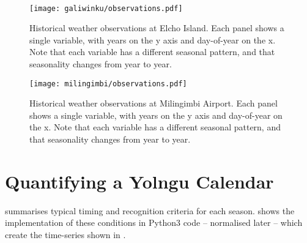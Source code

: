 ~\\



\begin{figure}[p]
    \centering
    \texttt{[image: galiwinku/observations.pdf]}
    \caption[Historical weather observations at Elcho Island]{
        Historical weather observations at Elcho Island.
        Each panel shows a single variable, with years on the y axis and day-of-year on the x.
        Note that each variable has a different seasonal pattern,
        and that seasonality changes from year to year.}
    \label{fig:galiwinku-observations}
\end{figure}
\begin{figure}[p]
    \centering
    \texttt{[image: milingimbi/observations.pdf]}
    \caption[Historical weather observations at Milingimbi Airport]{
        Historical weather observations at Milingimbi Airport.
        Each panel shows a single variable, with years on the y axis and day-of-year on the x.
        Note that each variable has a different seasonal pattern,
        and that seasonality changes from year to year.}
    \label{fig:milingimbi-observations}
\end{figure}




\section{Quantifying a Yolngu Calendar}

 summarises typical timing and recognition
criteria for each season.   shows the
implementation of these conditions in Python3 code -- normalised later --
which create the time-series shown in
.

